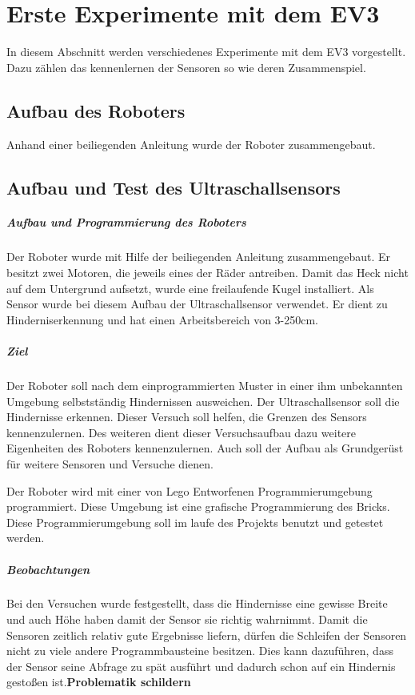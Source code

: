 \chapter{Erste Experimente mit dem EV3}
In diesem Abschnitt werden verschiedenes Experimente mit dem EV3 vorgestellt. Dazu zählen das kennenlernen der Sensoren so wie deren Zusammenspiel.
\section{Aufbau des Roboters} 
Anhand einer beiliegenden Anleitung wurde der Roboter zusammengebaut.
\section{Aufbau und Test des Ultraschallsensors}
\paragraph{Aufbau und Programmierung des Roboters}
Der Roboter wurde mit Hilfe der beiliegenden Anleitung zusammengebaut. Er besitzt zwei Motoren, die jeweils eines der Räder antreiben. Damit das Heck nicht auf dem Untergrund aufsetzt, wurde eine freilaufende Kugel installiert. 
Als Sensor wurde bei diesem Aufbau der Ultraschallsensor verwendet. Er dient zu Hinderniserkennung und hat einen Arbeitsbereich von 3-250cm.

\paragraph{Ziel}
Der Roboter soll nach dem einprogrammierten Muster in einer ihm unbekannten Umgebung selbstständig Hindernissen ausweichen. Der Ultraschallsensor soll die Hindernisse erkennen. Dieser Versuch soll helfen, die Grenzen des Sensors kennenzulernen. Des weiteren dient dieser Versuchsaufbau dazu weitere Eigenheiten des Roboters kennenzulernen. Auch soll der Aufbau als Grundgerüst für weitere Sensoren und Versuche dienen.  

Der Roboter wird mit einer von Lego Entworfenen Programmierumgebung programmiert. Diese Umgebung ist eine grafische Programmierung des Bricks. Diese Programmierumgebung soll im laufe des Projekts benutzt und getestet werden.
 
\paragraph{Beobachtungen} Bei den Versuchen wurde festgestellt, dass die Hindernisse eine gewisse Breite und auch Höhe haben damit der Sensor sie richtig wahrnimmt.
Damit die Sensoren zeitlich relativ gute Ergebnisse liefern, dürfen die Schleifen der Sensoren nicht zu viele andere Programmbausteine besitzen. Dies kann dazuführen, dass der Sensor seine Abfrage zu spät ausführt und dadurch schon auf ein Hindernis gestoßen ist.\textbf{Problematik schildern}

